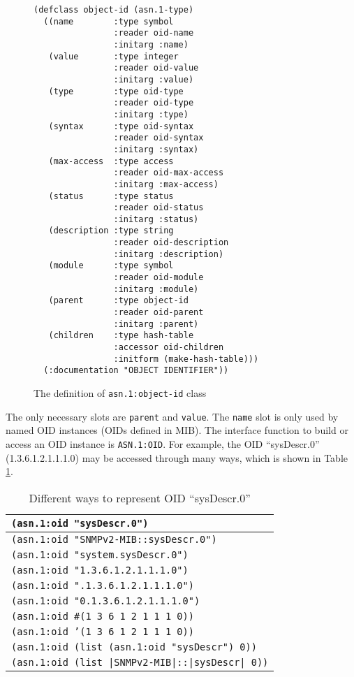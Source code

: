 \documentclass[reprint,9pt]{sigplanconf}
\begin{document}
\begin{figure}
\begin{verbatim}
(defclass object-id (asn.1-type)
  ((name        :type symbol
                :reader oid-name
                :initarg :name)
   (value       :type integer
                :reader oid-value
                :initarg :value)
   (type        :type oid-type
                :reader oid-type
                :initarg :type)
   (syntax      :type oid-syntax
                :reader oid-syntax
                :initarg :syntax)
   (max-access  :type access
                :reader oid-max-access
                :initarg :max-access)
   (status      :type status
                :reader oid-status
                :initarg :status)
   (description :type string
                :reader oid-description
                :initarg :description)
   (module      :type symbol
                :reader oid-module
                :initarg :module)
   (parent      :type object-id
                :reader oid-parent
                :initarg :parent)
   (children    :type hash-table
                :accessor oid-children
                :initform (make-hash-table)))
  (:documentation "OBJECT IDENTIFIER"))
\end{verbatim}
  \caption{The definition of \texttt{asn.1:object-id} class}
  \label{defclass:object-id}
\end{figure}

The only necessary slots are \texttt{parent} and \texttt{value}.
The \texttt{name} slot is only used by named OID instances (OIDs defined in MIB).
The interface function to build or access an OID instance is
\texttt{ASN.1:OID}.  For example, the OID ``sysDescr.0''
(1.3.6.1.2.1.1.1.0) may be accessed through many ways, which is shown
in Table \ref{table:oid}.

\begin{table}
  \centering
  \caption{Different ways to represent OID ``sysDescr.0''}
  \label{table:oid}
  \begin{tabular}{|l|}
    \hline
    \texttt{(asn.1:oid "sysDescr.0")}\\\hline
	\texttt{(asn.1:oid "SNMPv2-MIB::sysDescr.0")}\\\hline
    \texttt{(asn.1:oid "system.sysDescr.0")}\\\hline
    \texttt{(asn.1:oid "1.3.6.1.2.1.1.1.0")}\\\hline
    \texttt{(asn.1:oid ".1.3.6.1.2.1.1.1.0")}\\\hline
    \texttt{(asn.1:oid "0.1.3.6.1.2.1.1.1.0")}\\\hline
    \texttt{(asn.1:oid \#(1 3 6 1 2 1 1 1 0))}\\\hline
    \texttt{(asn.1:oid '(1 3 6 1 2 1 1 1 0))}\\\hline
    \texttt{(asn.1:oid (list (asn.1:oid "sysDescr") 0))}\\\hline
    \texttt{(asn.1:oid (list |SNMPv2-MIB|::|sysDescr| 0))}\\
    \hline
  \end{tabular}
\end{table}
\end{document}
